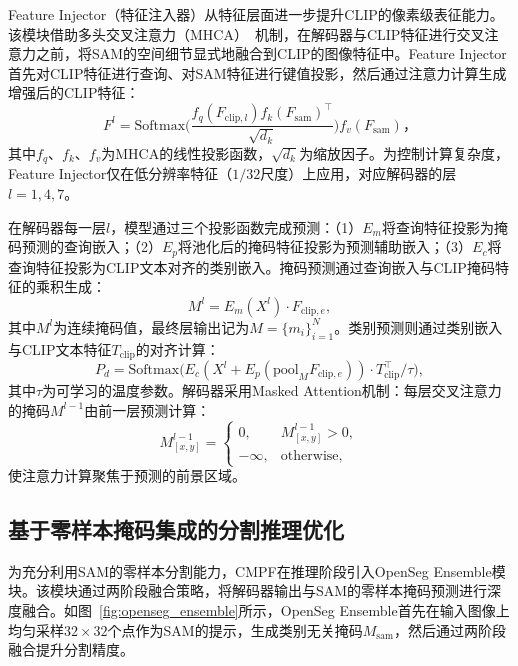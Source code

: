 Feature Injector（特征注入器）从特征层面进一步提升CLIP的像素级表征能力。该模块借助多头交叉注意力（MHCA）~\cite{vaswani2017attention}机制，在解码器与CLIP特征进行交叉注意力之前，将SAM的空间细节显式地融合到CLIP的图像特征中。Feature Injector首先对CLIP特征进行查询、对SAM特征进行键值投影，然后通过注意力计算生成增强后的CLIP特征：
\begin{equation}
F^l = \mathrm{Softmax}\bigg(\frac{f_q(F_{\mathrm{clip},l})f_k(F_{\mathrm{sam}})^\top}{\sqrt{d_k}}\bigg) f_v(F_{\mathrm{sam}})，
\label{eq:feature_injector}
\end{equation}
其中$f_q$、$f_k$、$f_v$为MHCA的线性投影函数，$\sqrt{d_k}$为缩放因子。为控制计算复杂度，Feature Injector仅在低分辨率特征（$1/32$尺度）上应用，对应解码器的层$l=1,4,7$。

在解码器每一层$l$，模型通过三个投影函数完成预测：（1）$E_m$将查询特征投影为掩码预测的查询嵌入；（2）$E_p$将池化后的掩码特征投影为预测辅助嵌入；（3）$E_c$将查询特征投影为CLIP文本对齐的类别嵌入。掩码预测通过查询嵌入与CLIP掩码特征的乘积生成：
\begin{equation}
M^l = E_m(X^l) \cdot F_{\mathrm{clip},e},
\label{eq:mask_pred}
\end{equation}
其中$M^l$为连续掩码值，最终层输出记为$M=\{m_i\}_{i=1}^N$。类别预测则通过类别嵌入与CLIP文本特征$T_{\mathrm{clip}}$的对齐计算：
\begin{equation}
P_d = \mathrm{Softmax}\big(E_c(X^l + E_p(\mathrm{pool}_M F_{\mathrm{clip},e})) \cdot T_{\mathrm{clip}}^\top / \tau\big),
\label{eq:class_pred}
\end{equation}
其中$\tau$为可学习的温度参数。解码器采用Masked Attention机制：每层交叉注意力的掩码$M^{l-1}$由前一层预测计算：
\begin{equation}
M^{l-1}_{[x,y]} = \begin{cases} 0, & M^{l-1}_{[x,y]} > 0, \\ -\infty, & \text{otherwise}, \end{cases}
\label{eq:mask_attn}
\end{equation}
使注意力计算聚焦于预测的前景区域。

\subsection{基于零样本掩码集成的分割推理优化}

\label{sec:chap4_openseg_ensemble}

为充分利用SAM的零样本分割能力，CMPF在推理阶段引入OpenSeg Ensemble模块。该模块通过两阶段融合策略，将解码器输出与SAM的零样本掩码预测进行深度融合。如图~\ref{fig:openseg_ensemble}所示，OpenSeg Ensemble首先在输入图像上均匀采样$32\times 32$个点作为SAM的提示，生成类别无关掩码$M_{\mathrm{sam}}$，然后通过两阶段融合提升分割精度。

